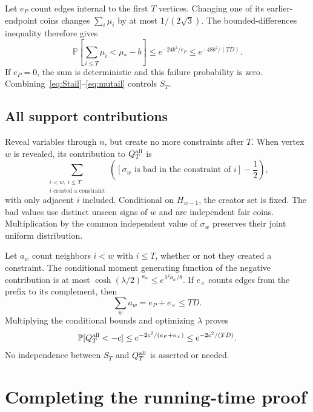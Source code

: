 \documentclass[11pt,a4paper]{article}
\theoremstyle{remark}
\newcommand{\Prb}{\mathbb P}
\begin{document}
Let $e_P$ count edges internal to the first $T$ vertices. Changing one
of its earlier-endpoint coins changes $\sum_i\mu_i$ by at most
$1/(2\sqrt3)$. The bounded-differences inequality therefore gives
\begin{equation}
 \Prb\left[\sum_{i\le T}\mu_i<\mu_*-b\right]
 \le e^{-24b^2/e_P}
 \le e^{-48b^2/(TD)}.                               \label{eq:mutail}
\end{equation}
If $e_P=0$, the sum is deterministic and this failure probability is zero.
Combining~\eqref{eq:Stail}--\eqref{eq:mutail} controls $S_T$.

\subsection{All support contributions}

Reveal variables through $n$, but create no more constraints after $T$.
When vertex $w$ is revealed, its contribution to $Q_T^{\rm all}$ is
\[
 \sum_{\substack{i<w,\ i\le T\\ i\text{ created a constraint}}}
       \left([\sigma_w\text{ is bad in the constraint of }i]-\frac12\right),
\]
with only adjacent $i$ included. Conditional on $H_{w-1}$, the creator
set is fixed. The bad values use distinct unseen signs of $w$ and are
independent fair coins. Multiplication by the common independent value
of $\sigma_w$ preserves their joint uniform distribution.

Let $a_w$ count neighbors $i<w$ with $i\le T$, whether or not they
created a constraint. The conditional moment generating function of
the negative contribution is at most
$\cosh(\lambda/2)^{a_w}\le e^{\lambda^2a_w/8}$.
If $e_\times$ counts edges from the prefix to its complement, then
\[
 \sum_w a_w=e_P+e_\times\le TD.
\]
Multiplying the conditional bounds and optimizing $\lambda$ proves
\begin{equation}
 \Prb[Q_T^{\rm all}<-c]
 \le e^{-2c^2/(e_P+e_\times)}
 \le e^{-2c^2/(TD)}.                               \label{eq:Qtail}
\end{equation}
No independence between $S_T$ and $Q_T^{\rm all}$ is asserted or needed.

\section{Completing the running-time proof}
\end{document}

